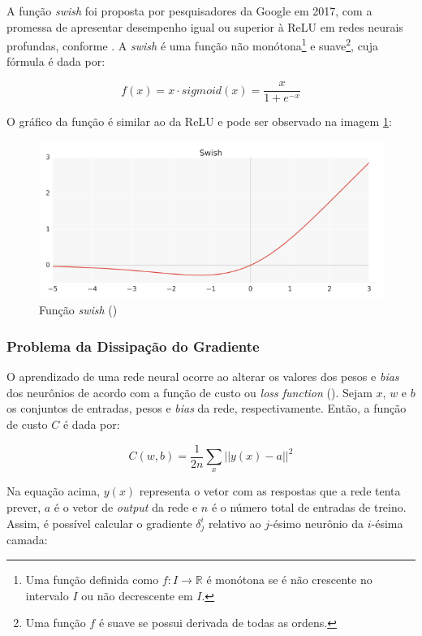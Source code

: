 A função \textit{swish} foi proposta por pesquisadores da 
Google em 2017, com a promessa de apresentar desempenho igual 
ou superior à ReLU em redes neurais profundas, conforme \cite{swish}. A \textit{swish} é uma função 
não monótona\footnote{Uma função definida como $f: I \rightarrow \mathbb{R}$
é monótona se é não crescente no intervalo $I$ ou não decrescente em $I$.} e 
suave\footnote{Uma função $f$ é suave se possui derivada de todas as ordens.},
cuja fórmula é dada por:

\begin{equation}
  f(x) = x \cdot sigmoid(x) = \frac{x}{1+e^{-x}}
\end{equation}


O gráfico da função é similar ao da ReLU e pode ser observado na imagem \ref{fig:swish}:

\begin{figure}[H] 
  \includegraphics[width= 12cm]{../figuras/swish.png}
  \caption{Função \textit{swish} (\cite{swish})}
  \label{fig:swish}
\end{figure}


\subsubsection{Problema da Dissipação do Gradiente}
\label{sec:vanishing_gradient_problem}

O aprendizado de uma rede neural ocorre ao alterar os valores dos pesos
e \textit{bias} dos neurônios de acordo com a função de custo ou \textit{loss function} (\cite{neuralnetworksanddeeplearning}). 
Sejam $x$, $w$ e $b$ os conjuntos de entradas,
pesos e \textit{bias} da rede, respectivamente. Então, a função de custo $C$ é dada por:

\begin{equation}
  C(w,b) = \frac{1}{2n}\sum_x || y(x) - a ||^2
\label{eq:func_custo}
\end{equation}

Na equação acima, $y(x)$ representa o vetor com as respostas
que a rede tenta prever, $a$ é o vetor de \textit{output} da rede e 
$n$ é o número total de entradas de treino. Assim, é possível calcular o gradiente $\delta_j^i$
relativo ao $j$-ésimo neurônio da $i$-ésima camada:

